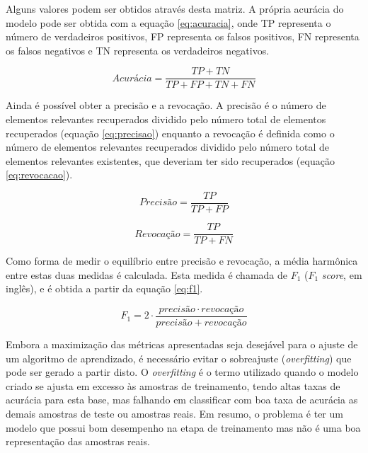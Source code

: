 Alguns valores podem ser obtidos através desta matriz. A própria acurácia do modelo pode ser obtida com a equação \ref{eq:acuracia}, onde TP representa o número de verdadeiros positivos, FP representa os falsos positivos, FN representa os falsos negativos e TN representa os verdadeiros negativos.

\begin{equation}
  \displaystyle Acurácia = \frac{TP+TN}{TP+FP+TN+FN}
\label{eq:acuracia}
\end{equation}

Ainda é possível obter a precisão e a revocação. A precisão é o número de elementos relevantes recuperados dividido pelo número total de elementos recuperados (equação \ref{eq:precisao}) enquanto a revocação é definida como o número de elementos relevantes recuperados dividido pelo número total de elementos relevantes existentes, que deveriam ter sido recuperados (equação \ref{eq:revocacao}).

\begin{equation}
  \displaystyle Precisão = \frac{TP}{TP+FP}
\label{eq:precisao}
\end{equation}

\begin{equation}
  \displaystyle Revocação = \frac{TP}{TP+FN}
\label{eq:revocacao}
\end{equation}

Como forma de medir o equilíbrio entre precisão e revocação, a média harmônica entre estas duas medidas é calculada. Esta medida é chamada de $F_1$ ($F_1$ \textit{score}, em inglês), e é obtida a partir da equação \ref{eq:f1}.

\begin{equation}
  \displaystyle F_1 = 2 \cdot \frac{precisão \cdot revocação}{precisão + revocação}
\label{eq:f1}
\end{equation}

Embora a maximização das métricas apresentadas seja desejável para o ajuste de um algoritmo de aprendizado, é necessário evitar o sobreajuste (\textit{overfitting}) que pode ser gerado a partir disto. O \textit{overfitting} é o termo utilizado quando o modelo criado se ajusta em excesso às amostras de treinamento, tendo altas taxas de acurácia para esta base, mas falhando em classificar com boa taxa de acurácia as demais amostras de teste ou amostras reais. Em resumo, o problema é ter um modelo que possui bom desempenho na etapa de treinamento mas não é uma boa representação das amostras reais.

